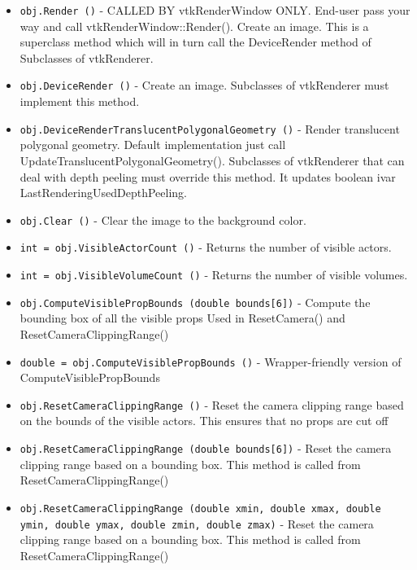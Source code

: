 \begin{itemize}
\item  \verb|obj.Render ()| -  CALLED BY vtkRenderWindow ONLY. End-user pass your way and call
 vtkRenderWindow::Render().
 Create an image. This is a superclass method which will in turn
 call the DeviceRender method of Subclasses of vtkRenderer.

\item  \verb|obj.DeviceRender ()| -  Create an image. Subclasses of vtkRenderer must implement this method.

\item  \verb|obj.DeviceRenderTranslucentPolygonalGeometry ()| -  Render translucent polygonal geometry. Default implementation just call
 UpdateTranslucentPolygonalGeometry().
 Subclasses of vtkRenderer that can deal with depth peeling must
 override this method.
 It updates boolean ivar LastRenderingUsedDepthPeeling.

\item  \verb|obj.Clear ()| -  Clear the image to the background color.

\item  \verb|int = obj.VisibleActorCount ()| -  Returns the number of visible actors.

\item  \verb|int = obj.VisibleVolumeCount ()| -  Returns the number of visible volumes.

\item  \verb|obj.ComputeVisiblePropBounds (double bounds[6])| -  Compute the bounding box of all the visible props
 Used in ResetCamera() and ResetCameraClippingRange()

\item  \verb|double = obj.ComputeVisiblePropBounds ()| -  Wrapper-friendly version of ComputeVisiblePropBounds

\item  \verb|obj.ResetCameraClippingRange ()| -  Reset the camera clipping range based on the bounds of the
 visible actors. This ensures that no props are cut off

\item  \verb|obj.ResetCameraClippingRange (double bounds[6])| -  Reset the camera clipping range based on a bounding box.
 This method is called from ResetCameraClippingRange()

\item  \verb|obj.ResetCameraClippingRange (double xmin, double xmax, double ymin, double ymax, double zmin, double zmax)| -  Reset the camera clipping range based on a bounding box.
 This method is called from ResetCameraClippingRange()


\end{itemize}
